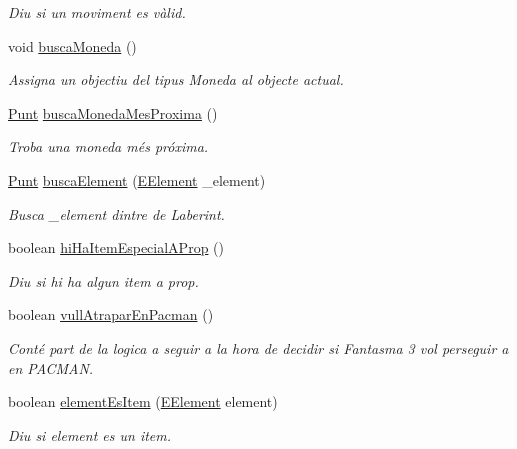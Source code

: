 \begin{DoxyCompactItemize}
\begin{DoxyCompactList}\small\item\em Diu si un moviment es vàlid. \end{DoxyCompactList}\item 
void \hyperlink{classlogica_1_1_fantasma3_a112aa6d0c3a8536490a09724bd9daeab}{busca\+Moneda} ()
\begin{DoxyCompactList}\small\item\em Assigna un objectiu del tipus Moneda al objecte actual. \end{DoxyCompactList}\item 
\hyperlink{classlogica_1_1_punt}{Punt} \hyperlink{classlogica_1_1_fantasma3_a447bfe80d247a3a653b9f1ce9d920cd9}{busca\+Moneda\+Mes\+Proxima} ()
\begin{DoxyCompactList}\small\item\em Troba una moneda més próxima. \end{DoxyCompactList}\item 
\hyperlink{classlogica_1_1_punt}{Punt} \hyperlink{classlogica_1_1_fantasma3_a90fb356d375f93ecf845e4c804de0e60}{busca\+Element} (\hyperlink{enumlogica_1_1enumeracions_1_1_e_element}{E\+Element} \+\_\+element)
\begin{DoxyCompactList}\small\item\em Busca \+\_\+element dintre de Laberint. \end{DoxyCompactList}\item 
boolean \hyperlink{classlogica_1_1_fantasma3_a233382b72cb5b1293e1517f0b13c15f4}{hi\+Ha\+Item\+Especial\+A\+Prop} ()
\begin{DoxyCompactList}\small\item\em Diu si hi ha algun item a prop. \end{DoxyCompactList}\item 
boolean \hyperlink{classlogica_1_1_fantasma3_a9156a1b97e0265824cb2b8c9e235af58}{vull\+Atrapar\+En\+Pacman} ()
\begin{DoxyCompactList}\small\item\em Conté part de la logica a seguir a la hora de decidir si Fantasma 3 vol perseguir a en P\+A\+C\+M\+A\+N. \end{DoxyCompactList}\item 
boolean \hyperlink{classlogica_1_1_fantasma3_a0b6b9f133f2d018f292939e5ecb27c0e}{element\+Es\+Item} (\hyperlink{enumlogica_1_1enumeracions_1_1_e_element}{E\+Element} element)
\begin{DoxyCompactList}\small\item\em Diu si element es un item. \end{DoxyCompactList}\item 

\end{DoxyCompactItemize}
